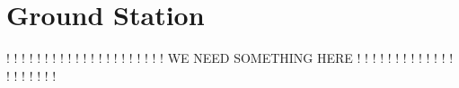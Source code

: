 \section{Ground Station}\label{sec:gs}


			! !	! ! ! ! ! ! ! ! ! ! ! !
! ! ! ! ! ! ! WE NEED SOMETHING HERE ! ! ! ! ! !
			! ! ! ! ! ! ! ! ! ! ! ! ! !